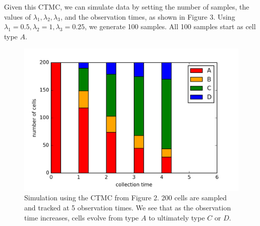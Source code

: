 \documentclass[11pt,onecolumn]{article}
\begin{document}
Given this CTMC, we can simulate data by setting the number of samples, the values of $\lambda_1, \lambda_2, \lambda_3$, and the observation times, as shown in Figure 3. Using $\lambda_1 = 0.5, \lambda_2 = 1, \lambda_3 = 0.25$, we generate 100 samples. All 100 samples start as cell type $A$. \\

\begin{figure}[!htb]
		\captionsetup{width=.8\linewidth}
		\caption{Simulation using the CTMC from Figure 2. 200 cells are sampled and tracked at 5 observation times. We see that as the observation time increases, cells evolve from type $A$ to ultimately type $C$ or $D$.}
		\centering
		\includegraphics[scale=0.65]{Fig2.png}
\end{figure}
\end{document}

